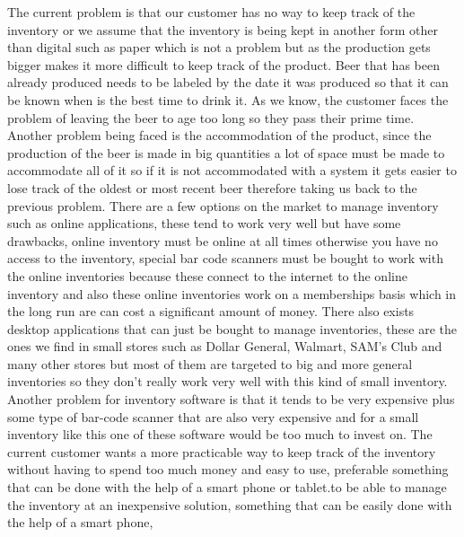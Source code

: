 The current problem is that our customer has no way to keep track of the inventory or we assume that the inventory is being kept in another form other than digital such as paper which is not a problem but as the production gets bigger makes it more difficult to keep track of the product. Beer that has been already produced needs to be labeled by the date it was produced so that it can be known when is the best time to drink it. As we know, the customer faces the problem of leaving the beer to age too long so they pass their prime time. Another problem being faced is the accommodation of the product, since the production of the beer is made in big quantities a lot of space must be made to accommodate all of it so if it is not accommodated with a system it gets easier to lose track of the oldest or most recent beer therefore taking us back to the previous problem. There are a few options on the market to manage inventory such as online applications, these tend to work very well but have some drawbacks, online inventory must be online at all times otherwise you have no access to the inventory, special bar code scanners must be bought to work with the online inventories because these connect to the internet to the online inventory and also these online inventories work on a memberships basis which in the long run are can cost a significant amount of money. There also exists desktop applications that can just be bought to manage inventories, these are the ones we find in small stores such as Dollar General, Walmart, SAM's Club and many other stores but most of them are targeted to big and more general inventories so they don't really work very well with this kind of small inventory. Another problem for inventory software is that it tends to be very expensive plus some type of bar-code scanner that are also very expensive and for a small inventory like this one of these software would be too much to invest on. The current customer wants a more practicable way to keep track of the inventory without having to spend too much money and easy to use, preferable something that can be done with the help of a smart phone or tablet.to be able to manage the inventory at an inexpensive solution, something that can be easily done with the help of a smart phone,